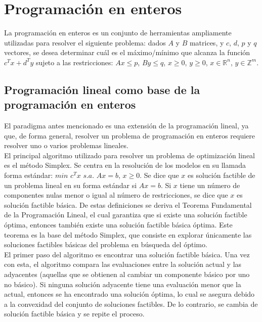 \documentclass[12pt]{report}
\begin{document}
\section{Programación en enteros}

La programación en enteros es un conjunto de herramientas ampliamente utilizadas para resolver el siguiente problema: dados $A$ y $B$ matrices, y $c$, $d$, $p$ y $q$ vectores, se desea determinar cuál es el máximo/mínimo que alcanza la función $c^Tx+d^Ty$ sujeto a las restricciones: $Ax\leq p$, $By\leq q$, $x\geq 0$, $y\geq 0$, $x\in \mathbb{R} ^n$, $y\in \mathbb{Z}^m$.  


\subsection{Programación lineal como base de la programación en enteros}

El paradigma antes mencionado es una extensión de la programación lineal, ya que, de forma general, resolver un problema de programación en enteros requiere resolver uno o varios problemas lineales.\\

El principal algoritmo utilizado para resolver un problema de optimización lineal es el método Simplex. Se centra en la resolución de los modelos en su llamada forma estándar: $min$ $c^Tx$ $s.a.$ $Ax=b$, $x\geq 0$.  Se dice que $x$ es solución factible de un problema lineal en su forma estándar si $Ax=b$. Si $x$ tiene un número de componentes nulas menor o igual al número de restricciones, se dice que $x$ es solución factible básica. De estas definiciones se deriva el Teorema Fundamental de la Programación Lineal, el cual garantiza que si existe una solución factible óptima, entonces también existe una solución factible básica óptima. Este teorema es la base del método Simplex, que consiste en explorar únicamente las soluciones factibles básicas del problema en búsqueda del óptimo.\\

El primer paso del algoritmo es encontrar una solución factible básica. Una vez con esta, el algoritmo compara las evaluaciones entre la solución actual y las adyacentes (aquellas que se obtienen al cambiar un componente básico por uno no básico). Si ninguna solución adyacente tiene una evaluación menor que la actual, entonces se ha encontrado una solución óptima, lo cual se asegura debido a la convexidad del conjunto de soluciones factibles. De lo contrario, se cambia de solución factible básica y se repite el proceso.\\
\end{document}
